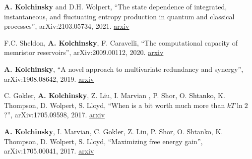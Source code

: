 
\textbf{A. Kolchinsky} and D.H. Wolpert, ``The state dependence of integrated, instantaneous, and fluctuating entropy production in quantum and classical processes'', arXiv:2103.05734, 2021. \href{http://arxiv.org/abs/2103.05734}{arxiv}


F.C. Sheldon, \textbf{A. Kolchinsky}, F. Caravelli, ``The computational capacity of memristor reservoirs'', arXiv:2009.00112, 2020. \href{http://arxiv.org/abs/2009.00112}{arxiv}


\textbf{A. Kolchinsky}, ``A novel approach to multivariate redundancy and synergy'', arXiv:1908.08642, 2019. \href{https://arxiv.org/abs/1908.08642}{arxiv}

C. Gokler, \textbf{A. Kolchinsky}, Z. Liu, I. Marvian , P. Shor, O. Shtanko, K. Thompson, D. Wolpert, S. Lloyd, ``When is a bit worth much more than $kT \ln 2$?'', arXiv:1705.09598, 2017. \href{https://arxiv.org/abs/1705.09598}{arxiv}

\textbf{A. Kolchinsky}, I. Marvian, C. Gokler, Z. Liu, P. Shor, O. Shtanko, K. Thompson, D. Wolpert, S. Lloyd, ``Maximizing free energy gain'', arXiv:1705.00041, 2017. \href{https://arxiv.org/abs/1705.00041}{arxiv}

